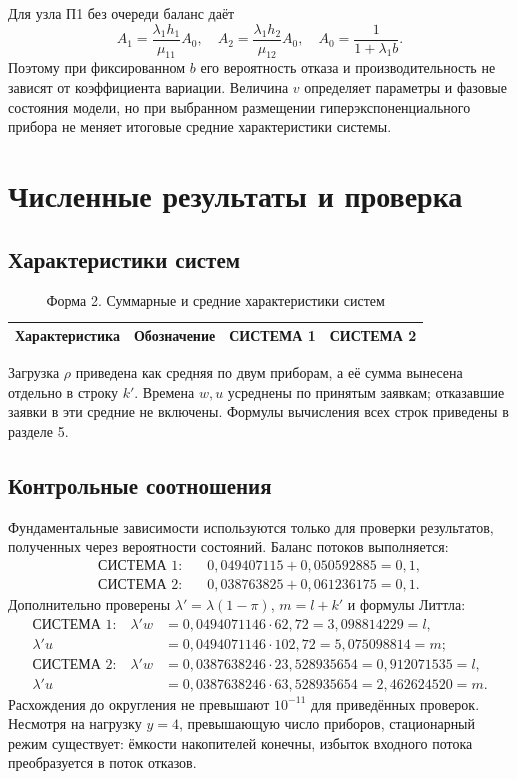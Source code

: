 \documentclass[11pt,a4paper]{article}
\begin{document}
Для узла П1 без очереди баланс даёт
\[
A_1=\frac{\lambda_1h_1}{\mu_{11}}A_0,\quad
A_2=\frac{\lambda_1h_2}{\mu_{12}}A_0,\quad
A_0=\frac{1}{1+\lambda_1b}.
\]
Поэтому при фиксированном $b$ его вероятность отказа и производительность не зависят от коэффициента вариации. Величина $v$ определяет параметры и фазовые состояния модели, но при выбранном размещении гиперэкспоненциального прибора не меняет итоговые средние характеристики системы.

\newpage
\section{Численные результаты и проверка}
\subsection{Характеристики систем}
\begin{table}[H]\centering
\caption{Форма 2. Суммарные и средние характеристики систем}
\small\setlength{\tabcolsep}{4pt}
\begin{tabular}{>{\raggedright\arraybackslash}p{4.8cm}crr}
\toprule
Характеристика & Обозначение & СИСТЕМА 1 & СИСТЕМА 2\\\midrule

\end{tabular}
\end{table}
Загрузка $\rho$ приведена как средняя по двум приборам, а её сумма вынесена отдельно в строку $k'$. Времена $w,u$ усреднены по принятым заявкам; отказавшие заявки в эти средние не включены. Формулы вычисления всех строк приведены в разделе 5.

\subsection{Контрольные соотношения}
Фундаментальные зависимости используются только для проверки результатов, полученных через вероятности состояний. Баланс потоков выполняется:
\begin{align*}
\text{СИСТЕМА 1:}\quad&0{,}049407115+0{,}050592885=0{,}1,\\
\text{СИСТЕМА 2:}\quad&0{,}038763825+0{,}061236175=0{,}1.
\end{align*}
Дополнительно проверены $\lambda'=\lambda(1-\pi)$, $m=l+k'$ и формулы Литтла:
\begin{align*}
\text{СИСТЕМА 1:}\quad
\lambda'w&=0{,}0494071146\cdot62{,}72=3{,}098814229=l,\\
\lambda'u&=0{,}0494071146\cdot102{,}72=5{,}075098814=m;\\[2pt]
\text{СИСТЕМА 2:}\quad
\lambda'w&=0{,}0387638246\cdot23{,}528935654=0{,}912071535=l,\\
\lambda'u&=0{,}0387638246\cdot63{,}528935654=2{,}462624520=m.
\end{align*}
Расхождения до округления не превышают $10^{-11}$ для приведённых проверок. Несмотря на нагрузку $y=4$, превышающую число приборов, стационарный режим существует: ёмкости накопителей конечны, избыток входного потока преобразуется в поток отказов.
\end{document}
